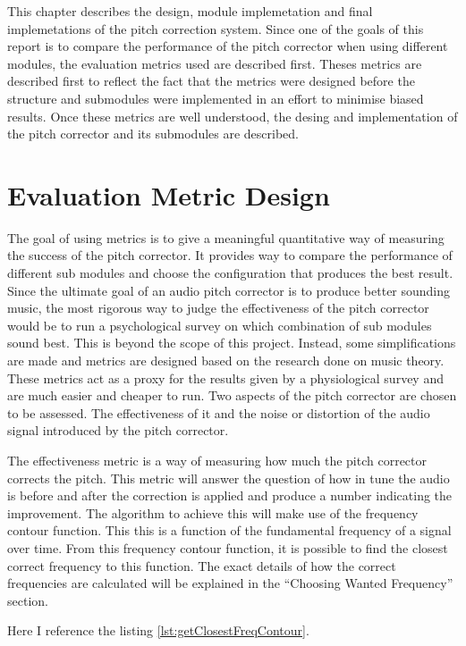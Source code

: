 
This chapter describes the design, module implemetation and final implemetations
of the pitch correction system. Since one of the goals of this report is to
compare the performance of the pitch corrector when using different modules, the
evaluation metrics used are described first. Theses metrics are described first to
reflect the fact that the metrics were designed before the structure and
submodules were implemented in an effort to minimise biased results. Once these
metrics are well understood, the desing and implementation of the pitch corrector
and its submodules are described.

\section{Evaluation Metric Design}

The goal of using metrics is to give a meaningful quantitative way of measuring
the success of the pitch corrector. It provides way to compare the performance of
different sub modules and choose the configuration that produces the best result.
Since the ultimate goal of an audio pitch corrector is to produce better sounding
music, the most rigorous way to judge the effectiveness of the pitch corrector
would be to run a psychological survey on which combination of sub modules sound
best. This is beyond the scope of this project. Instead, some simplifications are
made and metrics are designed based on the research done on music theory. These
metrics act as a proxy for the results given by a physiological survey and are
much easier and cheaper to run. Two aspects of the pitch corrector are chosen to
be assessed. The effectiveness of it and the noise or distortion of the audio
signal introduced by the pitch corrector.

The effectiveness metric is a way of measuring how much the pitch corrector
corrects the pitch. This metric will answer the question of how in tune the audio
is before and after the correction is applied and produce a number indicating the
improvement. The algorithm to achieve this will make use of the frequency contour
function. This this is a function of  the fundamental frequency of a signal over
time. From this frequency contour function, it is possible to find the closest
correct frequency to this function. The exact details of how the correct
frequencies are calculated will be explained in the ``Choosing Wanted Frequency''
section.

Here I reference the listing \ref{lst:getClosestFreqContour}.

